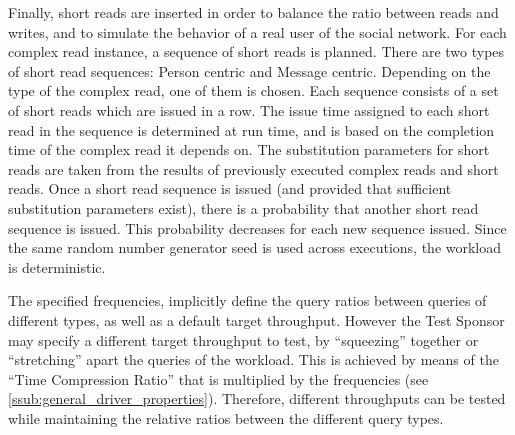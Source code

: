 Finally, short reads are inserted in order to balance the ratio between reads
and writes, and to simulate the behavior of a real user of the social network.
For each complex read instance, a sequence of short reads is planned. There are two
types of short read sequences: Person centric and Message centric. Depending on
the type of the complex read, one of them is chosen. Each sequence consists of
a set of short reads which are issued in a row. The issue time assigned to each
short read in the sequence is determined at run time, and is based on the
completion time of the complex read it depends on. 
The substitution parameters for short reads are taken from the results of previously
executed complex reads and short reads.
Once a short read sequence is issued (and provided that sufficient substitution parameters 
exist), there is a probability that another short read  sequence is issued. 
This probability decreases for each new sequence issued. 
Since the same random number generator seed is used across
executions, the workload is deterministic.


The specified frequencies, implicitly define the query ratios between queries
of different types, as well as a default target throughput. However the Test
Sponsor may specify a different target throughput to test,  by ``squeezing''
together or ``stretching'' apart the queries of the workload. This is
achieved  by means of the ``Time Compression Ratio'' that is multiplied by the
frequencies (see \ref{ssub:general_driver_properties}).  Therefore, different
throughputs can be tested while maintaining the relative ratios between the
different query types.
